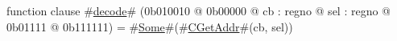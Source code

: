 function clause #\hyperref[zdecode]{decode}# (0b010010 @ 0b00000 @ cb : regno @ sel : regno @   0b01111 @ 0b111111) = #\hyperref[zSome]{Some}#(#\hyperref[zCGetAddr]{CGetAddr}#(cb, sel))
